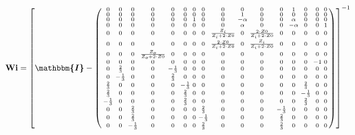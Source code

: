 \[ \mathbf{Wi} =  \left[ \boldsymbol{\mathbbm{I}}  -
\left(\begin{smallmatrix} 0 & 0 & 0 & 0 & 0 & 0 & 0 & 0 & 0 & 0 & 0 &
0 & 1 & 0 & 0 & 0 \\ 0 & 0 & 0 & 0 & 0 & 0 & 0 & 0 & 0 & 1 & 0 & 0 & 0
& 0 & 0 & 0 \\ 0 & 0 & 0 & 0 & 0 & 0 & 1 & 0 & 0 & -\alpha & 0 & 0 &
\alpha & 0 & 0 & 0 \\ 0 & 0 & 0 & 0 & 0 & 0 & 0 & 0 & 0 & \alpha & 0 &
0 & -\alpha & 0 & 0 & 1 \\ 0 & 0 & 0 & 0 & 0 & 0 & 0 & 0 &
\frac{Z_i}{Z_i+2\cdot Z0} & 0 & \frac{2\cdot Z0}{Z_i+2\cdot Z0} & 0 &
0 & 0 & 0 & 0 \\ 0 & 0 & 0 & 0 & 0 & 0 & 0 & 0 & \frac{2\cdot
Z0}{Z_i+2\cdot Z0} & 0 & \frac{Z_i}{Z_i+2\cdot Z0} & 0 & 0 & 0 & 0 & 0
\\ 0 & 0 & 0 & \frac{Z_o}{Z_o+2\cdot Z0} & 0 & 0 & 0 & 0 & 0 & 0 & 0 &
0 & 0 & 0 & 0 & 0 \\ 0 & 0 & 0 & 0 & 0 & 0 & 0 & 0 & 0 & 0 & 0 & 0 & 0
& 0 & -1 & 0 \\ 0 & \frac{2}{3} & 0 & 0 & -\frac{1}{3} & 0 & 0 & 0 & 0
& 0 & 0 & 0 & 0 & 0 & 0 & 0 \\ 0 & -\frac{1}{3} & 0 & 0 & \frac{2}{3}
& 0 & 0 & 0 & 0 & 0 & 0 & 0 & 0 & 0 & 0 & 0 \\ \frac{2}{3} & 0 & 0 & 0
& 0 & -\frac{1}{3} & 0 & 0 & 0 & 0 & 0 & 0 & 0 & \frac{2}{3} & 0 & 0
\\ \frac{2}{3} & 0 & 0 & 0 & 0 & \frac{2}{3} & 0 & 0 & 0 & 0 & 0 & 0 &
0 & -\frac{1}{3} & 0 & 0 \\ -\frac{1}{3} & 0 & 0 & 0 & 0 & \frac{2}{3}
& 0 & 0 & 0 & 0 & 0 & 0 & 0 & \frac{2}{3} & 0 & 0 \\ 0 & 0 &
\frac{2}{3} & 0 & 0 & 0 & 0 & \frac{2}{3} & 0 & 0 & 0 & -\frac{1}{3} &
0 & 0 & 0 & 0 \\ 0 & 0 & \frac{2}{3} & 0 & 0 & 0 & 0 & -\frac{1}{3} &
0 & 0 & 0 & \frac{2}{3} & 0 & 0 & 0 & 0 \\ 0 & 0 & -\frac{1}{3} & 0 &
0 & 0 & 0 & \frac{2}{3} & 0 & 0 & 0 & \frac{2}{3} & 0 & 0 & 0 & 0
\end{smallmatrix}\right) \right]^{-1}  \]
